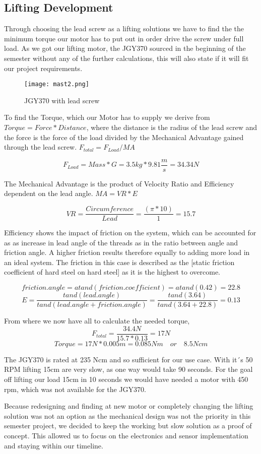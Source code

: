 \documentclass[../report.tex]{subfiles}
\begin{document}
\maketitle

\subsection{Lifting Development}
Through choosing the lead screw as a lifting solutions we have to find the
the minimum torque our motor has to put out in order drive the screw under full load.
As we got our lifting motor, the JGY370 sourced in the beginning of the semester without 
any of the further calculations, this will also state if it will fit our project requirements.

\begin{wrapfigure}{r}{0.5\textwidth}
    \centering
    \texttt{[image: mast2.png]}
    \caption{JGY370 with lead screw}
\end{wrapfigure}
To find the Torque, which our Motor has to supply we derive from $Torque=Force*Distance$, where the 
distance is the radius of the lead screw and the force is the force of the load divided by the Mechanical 
Advantage gained through the lead screw. $F_{total}=F_{Load}/MA$

\[F_{Load}=Mass*G=3.5kg*9.81\frac{m}{s}=34.34N\]

The Mechanical Advantage is the product of Velocity Ratio and Efficiency dependent on the lead 
angle. $MA=VR*E$ 

\[VR=\frac{Circumference}{Lead}=\frac{(\pi*10)}{1}=15.7\]

Efficiency shows the impact of friction on the system, which can be accounted for as as increase in lead angle of the threads 
as in the ratio between angle and friction angle. A higher friction results therefore equally to adding more load in an ideal 
system. The friction in this case is described as the \cite{friction_coefficient}[static 
friction coefficient of hard steel on hard steel] as it is the highest to overcome. 

\[friction.angle=atand(friction.coefficient)= atand(0.42)=22.8\]
\[E=\frac{tand(lead.angle)}{tand(lead.angle+friction.angle)}=\frac{tand(3.64)}{tand(3.64+22.8)}=0.13\]

From where we now have all to calculate the needed torque, 
\[F_{total}=\frac{34.4N}{15.7*0.13}=17N\]
\[Torque=17N*0.005m=0.085Nm\quad or \quad 8.5Ncm\]

The JGY370 is rated at 235 Ncm and so sufficient for our use case. With it´s 50 RPM
lifting 15cm are very slow, as one way would take 90 seconds. For the goal off lifting 
our load 15cm in 10 seconds we would have needed a motor with 450 rpm, which was not 
available for the JGY370.

Because redesigning and finding at new motor 
or completely changing the lifting solution was not an option as the mechanical design 
was not the priority in this semester project, we decided to keep the working but slow 
solution as a proof of concept. This allowed us to focus on the electronics and sensor 
implementation and staying within our timeline.
\end{document}

